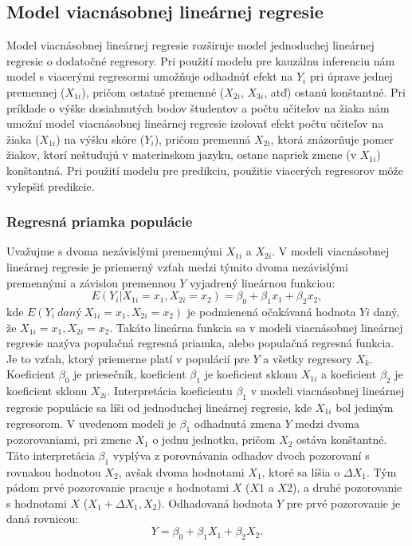 \documentclass[]{tukediphc}
\begin{document}
\subsection{Model viacnásobnej lineárnej regresie}

Model viacnásobnej lineárnej regresie rozširuje model jednoduchej lineárnej regresie o dodatočné regresory. Pri použití modelu pre kauzálnu inferenciu nám model s viacerými regresormi umožňuje odhadnúť efekt na $Y_{i}$ pri úprave jednej premennej ($X_{1i}$), pričom ostatné premenné ($X_{2i}$, $X_{3i}$, atď) ostanú konštantné. Pri príklade o výške dosiahnutých bodov študentov a počtu učiteľov na žiaka nám umožní model viacnásobnej lineárnej regresie izolovať efekt počtu učiteľov na žiaka ($X_{1i}$) na výšku skóre ($Y_{i}$), pričom premenná $X_{2i}$, ktorá znázorňuje pomer žiakov, ktorí neštudujú v materinskom jazyku, ostane napriek zmene (v $X_{1i}$) konštantná. Pri použití modelu pre predikciu, použitie viacerých regresorov môže vylepšiť predikcie. 

\subsubsection{Regresná priamka populácie}

Uvažujme s dvoma nezávislými premennými $X_{1i}$ a $X_{2i}$. V modeli viacnásobnej lineárnej regresie je priemerný vzťah medzi týmito dvoma nezávislými premennými a závislou premennou $Y$ vyjadrený lineárnou funkciou:
\begin{equation}
    E(Y_{i} | X_{1i} = x_{1},X_{2i}=x_{2}) = \beta_{0} + \beta_{1}x_{1} + \beta_{2}x_{2},
\end{equation}
kde $E(Y_{i} \ daný \ X_{1i} = x_{1},X_{2i}=x_{2})$ je podmienená očakávaná hodnota $Yi$ daný, že $X_{1i} = x_{1},X_{2i}=x_{2}$. 
Takáto lineárna funkcia sa v modeli viacnásobnej lineárnej regresie nazýva populačná regresná priamka, alebo populačná regresná funkcia. Je to vzťah, ktorý priemerne platí v populácií pre $Y$ a všetky regresory $X_k$. Koeficient $\beta_{0}$ je priesečník, koeficient $\beta_{1}$ je koeficient sklonu $X_{1i}$ a koeficient $\beta_{2}$ je koeficient sklonu $X_{2i}$. Interpretácia koeficientu $\beta_{1}$ v modeli viacnásobnej lineárnej regresie populácie sa líši od jednoduchej lineárnej regresie, kde $X_{1i}$ bol jediným regresorom. V uvedenom modeli je $\beta_{1}$ odhadnutá zmena $Y$ medzi dvoma pozorovaniami, pri zmene $X_1$ o jednu jednotku, pričom $X_2$ ostáva konštantné. Táto interpretácia $\beta_{1}$ vyplýva z porovnávania odhadov dvoch pozorovaní s rovnakou hodnotou $X_2$, avšak dvoma hodnotami $X_1$, ktoré sa líšia o $\Delta X_{1}$. Tým pádom prvé pozorovanie pracuje s hodnotami $X$ ($X1$ a $X2$), a druhé pozorovanie s hodnotami $X$ ($X_{1} + \Delta X_{1}, X_{2}$). Odhadovaná hodnota $Y$ pre prvé pozorovanie je daná rovnicou:
\begin{equation}
    Y = \beta_{0} + \beta_{1} X_{1} + \beta_{2} X_{2}.
\end{equation}
\end{document}
